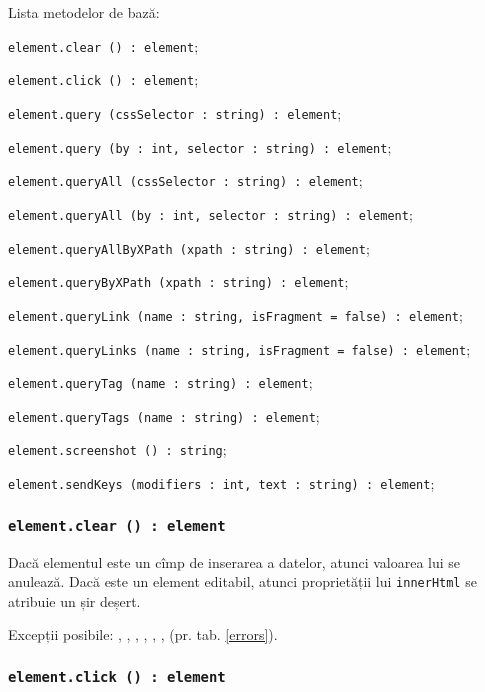 Lista metodelor de bază:
\begin{icItems}
\item \texttt{element.clear () : element};
\item \texttt{element.click () : element};
\item \texttt{element.query (cssSelector : string) : element};
\item \texttt{element.query (by : int, selector : string) : element};
\item \texttt{element.queryAll (cssSelector : string) : element};
\item \texttt{element.queryAll (by : int, selector : string) : element};
\item \texttt{element.queryAllByXPath (xpath : string) : element};
\item \texttt{element.queryByXPath (xpath : string) : element};
\item \texttt{element.queryLink (name : string, isFragment = false) : element};
\item \texttt{element.queryLinks (name : string, isFragment = false) : element};
\item \texttt{element.queryTag (name : string) : element};
\item \texttt{element.queryTags (name : string) : element};
\item \texttt{element.screenshot () : string};
\item \texttt{element.sendKeys (modifiers : int, text : string) : element};
\end{icItems}

\subsubsection{\texttt{element.clear () : element}}

Dacă elementul este un cîmp de inserarea a datelor, atunci valoarea lui se anulează. Dacă este un element editabil, atunci proprietății lui \texttt{innerHtml} se atribuie un șir deșert.

Excepții posibile: , , , , , ,  (pr. tab. \ref{errors}).

\subsubsection{\texttt{element.click () : element}}

